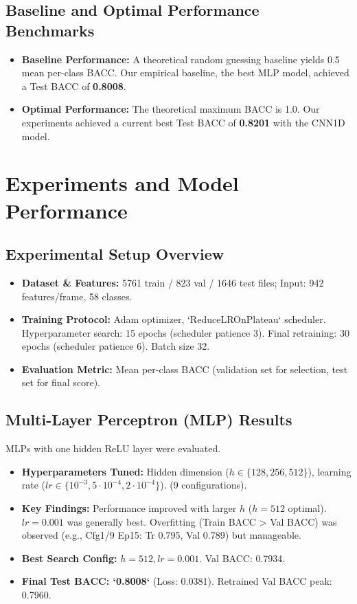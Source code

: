 \documentclass[11pt, a4paper]{article}
\begin{document}
\subsection{Baseline and Optimal Performance Benchmarks}
\begin{itemize}
    \item \textbf{Baseline Performance:} A theoretical random guessing baseline yields 0.5 mean per-class BACC. Our empirical baseline, the best MLP model, achieved a Test BACC of \textbf{0.8008}.
    \item \textbf{Optimal Performance:} The theoretical maximum BACC is 1.0. Our experiments achieved a current best Test BACC of \textbf{0.8201} with the CNN1D model.
\end{itemize}

\section{Experiments and Model Performance}
\label{sec:experiments}

\subsection{Experimental Setup Overview}
\begin{itemize}
    \item \textbf{Dataset \& Features:} 5761 train / 823 val / 1646 test files; Input: 942 features/frame, 58 classes.
    \item \textbf{Training Protocol:} Adam optimizer, `ReduceLROnPlateau` scheduler. Hyperparameter search: 15 epochs (scheduler patience 3). Final retraining: 30 epochs (scheduler patience 6). Batch size 32.
    \item \textbf{Evaluation Metric:} Mean per-class BACC (validation set for selection, test set for final score).
\end{itemize}

\subsection{Multi-Layer Perceptron (MLP) Results}
\label{ssec:mlp_results}
MLPs with one hidden ReLU layer were evaluated.
\begin{itemize}
    \item \textbf{Hyperparameters Tuned:} Hidden dimension ($h \in \{128, 256, 512\}$), learning rate ($lr \in \{10^{-3}, 5 \cdot 10^{-4}, 2 \cdot 10^{-4}\}$). (9 configurations).
    \item \textbf{Key Findings:} Performance improved with larger $h$ ($h=512$ optimal). $lr=0.001$ was generally best. Overfitting (Train BACC > Val BACC) was observed (e.g., Cfg1/9 Ep15: Tr 0.795, Val 0.789) but manageable.
    \item \textbf{Best Search Config:} $h=512, lr=0.001$. Val BACC: 0.7934.
    \item \textbf{Final Test BACC: `0.8008`} (Loss: 0.0381). Retrained Val BACC peak: 0.7960.
\end{itemize}
\end{document}

